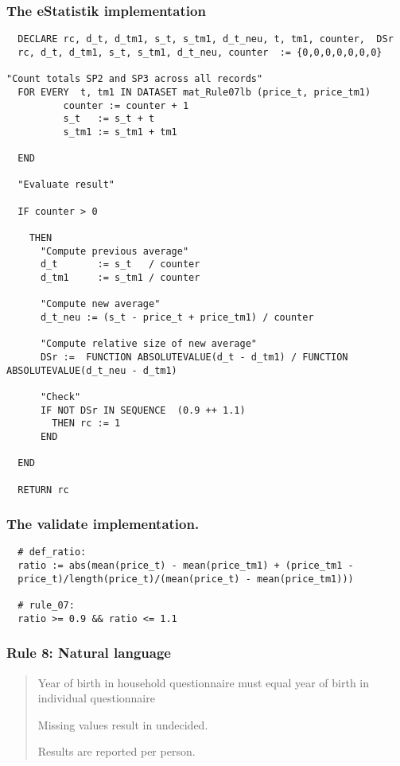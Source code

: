 \subsubsection*{The eStatistik implementation}
\begin{verbatim}
  DECLARE rc, d_t, d_tm1, s_t, s_tm1, d_t_neu, t, tm1, counter,  DSr
  rc, d_t, d_tm1, s_t, s_tm1, d_t_neu, counter  := {0,0,0,0,0,0,0}

"Count totals SP2 and SP3 across all records"
  FOR EVERY  t, tm1 IN DATASET mat_Rule07lb (price_t, price_tm1)
          counter := counter + 1
          s_t   := s_t + t
          s_tm1 := s_tm1 + tm1

  END

  "Evaluate result"

  IF counter > 0

    THEN 
      "Compute previous average"
      d_t       := s_t   / counter
      d_tm1     := s_tm1 / counter
	
      "Compute new average"
      d_t_neu := (s_t - price_t + price_tm1) / counter

      "Compute relative size of new average"
      DSr :=  FUNCTION ABSOLUTEVALUE(d_t - d_tm1) / FUNCTION ABSOLUTEVALUE(d_t_neu - d_tm1)

      "Check"
      IF NOT DSr IN SEQUENCE  (0.9 ++ 1.1)
        THEN rc := 1
      END

  END 
 
  RETURN rc
\end{verbatim}
\subsubsection*{The validate implementation.}
\begin{verbatim}
  # def_ratio:
  ratio := abs(mean(price_t) - mean(price_tm1) + (price_tm1 -
  price_t)/length(price_t)/(mean(price_t) - mean(price_tm1)))

  # rule_07:
  ratio >= 0.9 && ratio <= 1.1
\end{verbatim}


\newpage

\subsubsection*{  Rule 8: Natural language}
\begin{quote}


Year of birth in household questionnaire must equal year of birth in individual questionnaire

Missing values result in undecided.

Results are reported per person.


\end{quote}
